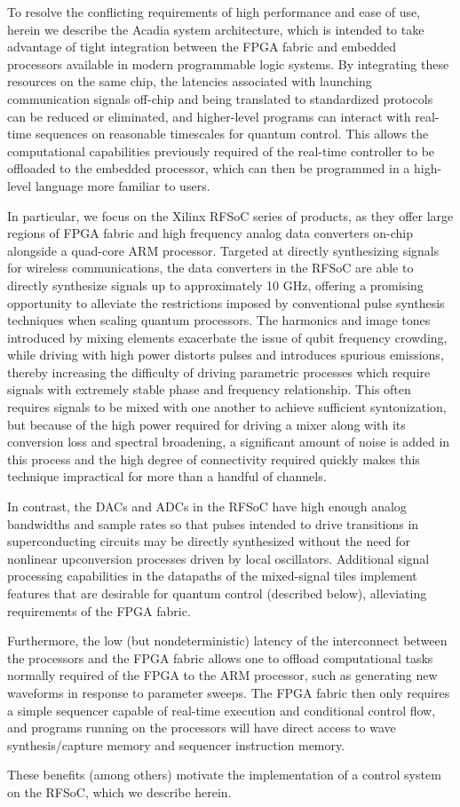 To resolve the conflicting requirements of high performance and ease of use, herein we describe the Acadia system architecture, which is intended to take advantage of tight integration between the FPGA fabric and embedded processors available in modern programmable logic systems. By integrating these resources on the same chip, the latencies associated with launching communication signals off-chip and being translated to standardized protocols can be reduced or eliminated, and higher-level programs can interact with real-time sequences on reasonable timescales for quantum control. This allows the computational capabilities previously required of the real-time controller to be offloaded to the embedded processor, which can then be programmed in a high-level language more familiar to users.

In particular, we focus on the Xilinx RFSoC series of products, as they offer large regions of FPGA fabric and high frequency analog data converters on-chip alongside a quad-core ARM processor. Targeted at directly synthesizing signals for wireless communications, the data converters in the RFSoC are able to directly synthesize signals up to approximately 10 GHz, offering a promising opportunity to alleviate the restrictions imposed by conventional pulse synthesis techniques when scaling quantum processors. The harmonics and image tones introduced by mixing elements exacerbate the issue of qubit frequency crowding, while driving with high power distorts pulses and introduces spurious emissions, thereby increasing the difficulty of driving parametric processes which require signals with extremely stable phase and frequency relationship. This often requires signals to be mixed with one another to achieve sufficient syntonization, but because of the high power required for driving a mixer along with its conversion loss and spectral broadening, a significant amount of noise is added in this process and the high degree of connectivity required quickly makes this technique impractical for more than a handful of channels.

In contrast, the DACs and ADCs in the RFSoC have high enough analog bandwidths and sample rates so that pulses intended to drive transitions in superconducting circuits may be directly synthesized without the need for nonlinear upconversion processes driven by local oscillators. Additional signal processing capabilities in the datapaths of the mixed-signal tiles implement features that are desirable for quantum control (described below), alleviating requirements of the FPGA fabric.

Furthermore, the low (but nondeterministic) latency of the interconnect between the processors and the FPGA fabric allows one to offload computational tasks normally required of the FPGA to the ARM processor, such as generating new waveforms in response to parameter sweeps. The FPGA fabric then only requires a simple sequencer capable of real-time execution and conditional control flow, and programs running on the processors will have direct access to wave synthesis/capture memory and sequencer instruction memory. 

These benefits (among others) motivate the implementation of a control system on the RFSoC, which we describe herein.
